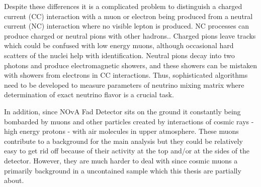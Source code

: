 Despite these differences it is a complicated problem to distinguish a charged current (CC) interaction with
a muon or electron being produced from a neutral current (NC) interaction where no visible lepton is produced.
NC processes can produce charged or neutral pions with other hadrons.. Charged pions
leave tracks which could be confused with low energy muons, although occasional hard scatters of the 
nuclei help with identification. Neutral pions decay into two photons and produce electromagnetic
showers, and these showers can be mistaken with showers from electrons in CC interactions.
Thus, sophisticated algorithms need to be developed to measure parameters of neutrino mixing matrix where 
determination of exact neutrino flavor is a crucial task.

In addition, since NOvA Fad Detector sits on the ground it constantly being bombarded by muons and other
particles created by interactions of cosmic rays - high energy protons - with air molecules in upper atmosphere. 
These muons contribute to a background for the main analysis but they could be relatively easy to get rid off
because of their activity at the top and/or at the sides of the detector. However, they are much harder to deal
with since cosmic muons a primarily background in a uncontained sample which this thesis are partially about.

